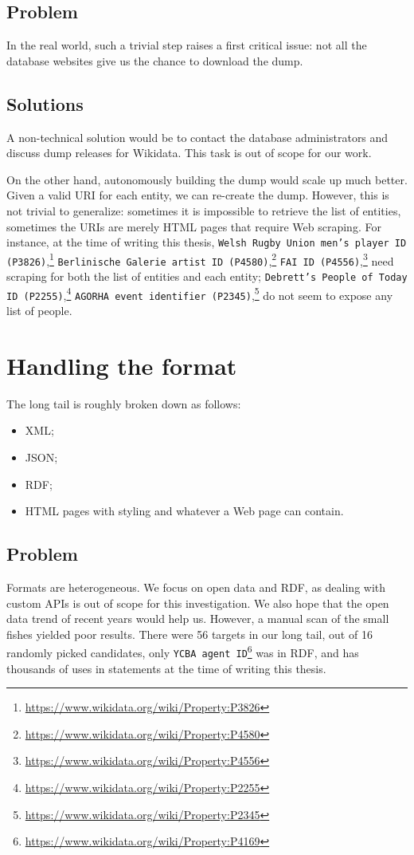 \subsection{Problem}
\label{cha:311}
In the real world, such a trivial step raises a first critical issue: not all the database websites give us the chance to download the dump.

\subsection{Solutions}
\label{cha:312}
A non-technical solution would be to contact the database administrators and discuss dump releases for Wikidata. This task is out of scope for our work.

On the other hand, autonomously building the dump would scale up much better. Given a valid URI for each entity, we can re-create the dump. However, this is not trivial to generalize: sometimes it is impossible to retrieve the list of entities, sometimes the URIs are merely HTML pages that require Web scraping. For instance, at the time of writing this thesis, \texttt{Welsh Rugby Union men's player ID (P3826)},\footnote{\url{https://www.wikidata.org/wiki/Property:P3826}} \texttt{Berlinische Galerie artist ID (P4580)},\footnote{\url{https://www.wikidata.org/wiki/Property:P4580}} \texttt{FAI ID (P4556)},\footnote{\url{https://www.wikidata.org/wiki/Property:P4556}} need scraping for both the list of entities and each entity; \texttt{Debrett's People of Today ID (P2255)},\footnote{\url{https://www.wikidata.org/wiki/Property:P2255}} \texttt{AGORHA event identifier (P2345)},\footnote{\url{https://www.wikidata.org/wiki/Property:P2345}} do not seem to expose any list of people.

\section{Handling the format}
\label{cha:32}
The long tail is roughly broken down as follows:
\begin{itemize}
    \item XML;
    \item JSON;
    \item RDF;
    \item HTML pages with styling and whatever a Web page can contain.
\end{itemize}

\subsection{Problem}
\label{cha:321}
Formats are heterogeneous. We focus on open data and RDF, as dealing with custom APIs is out of scope for this investigation. We also hope that the open data trend of recent years would help us. However, a manual scan of the small fishes yielded poor results. There were 56 targets in our long tail, out of 16 randomly picked candidates, only \texttt{YCBA agent ID}\footnote{\url{https://www.wikidata.org/wiki/Property:P4169}} was in RDF, and has thousands of uses in statements at the time of writing this thesis.
